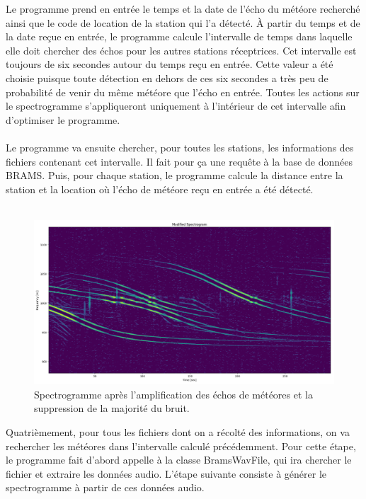 \documentclass[11pt]{article}
\begin{document}
Le programme prend en entrée le temps et la date de l'écho du météore recherché ainsi que le code de location de la station qui l'a détecté.
À partir du temps et de la date reçue en entrée, le programme calcule l'intervalle de temps dans laquelle elle doit chercher des échos pour les autres stations réceptrices.
Cet intervalle est toujours de six secondes autour du temps reçu en entrée.
Cette valeur a été choisie puisque toute détection en dehors de ces six secondes a très peu de probabilité de venir du même météore que l'écho en entrée.
Toutes les actions sur le spectrogramme s'appliqueront uniquement à l'intérieur de cet intervalle afin d'optimiser le programme.\\
\\
Le programme va ensuite chercher, pour toutes les stations, les informations des fichiers contenant cet intervalle.
Il fait pour ça une requête à la base de données BRAMS.
Puis, pour chaque station, le programme calcule la distance entre la station et la location où l'écho de météore reçu en entrée a été détecté.\\
\\
\begin{figure}[t]
    \begin{center}
        \includegraphics[scale=0.22]{Screenshot from 2022-05-31 16-32-43.png}
        \caption{Spectrogramme après l'amplification des échos de météores et la suppression de la majorité du bruit.}
    \end{center}
\end{figure}
Quatrièmement, pour tous les fichiers dont on a récolté des informations, on va rechercher les météores dans l'intervalle calculé précédemment.
Pour cette étape, le programme fait d'abord appelle à la classe BramsWavFile, qui ira chercher le fichier et extraire les données audio.
L'étape suivante consiste à générer le spectrogramme à partir de ces données audio.
\end{document}
